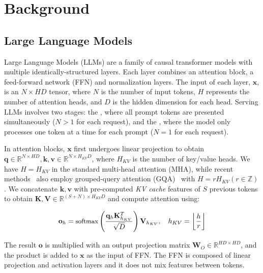 \section{Background}
\subsection{Large Language Models}
\label{sect:background:preliminaries}

Large Language Models (LLMs) are a family of causal transformer models with multiple identically-structured layers. Each layer combines an attention block, a feed-forward network (FFN) and normalization layers. The input of each layer, $\mathbf{x}$, is an $N\times HD$ tensor, where $N$ is the number of input tokens, $H$ represents the number of attention heads, and $D$ is the hidden dimension for each head. Serving LLMs involves two stages: the \contextstage, where all prompt tokens are presented simultaneously ($N > 1$ for each request), and the \decodingstage, where the model only processes one token at a time for each prompt ($N = 1$ for each request).

In attention blocks, $\mathbf{x}$ first undergoes linear projection to obtain $\mathbf{q}\in\mathbb{R}^{N\times HD},\mathbf{k},\mathbf{v}\in\mathbb{R}^{N\times H_{KV}D}$, where $H_{KV}$ is the number of key/value heads. We have $H = H_{KV}$ in the standard multi-head attention (MHA), while recent methods~\cite{touvron2023llama2,jiang2023mistral,jiang2024mixtral} also employ grouped-query attention (GQA)~\cite{ainslie2023gqa} with $H = rH_{KV} (r\in \mathbb{Z})$. We concatenate $\mathbf{k},\mathbf{v}$ with pre-computed \textit{KV cache} features of $S$ previous tokens to obtain $\mathbf{K}, \mathbf{V}\in\mathbb{R}^{(S+N)\times H_{KV}D}$ and compute attention using:

\vspace{-10pt}
\begin{equation}
\small
\mathbf{o}_{h} = \text{softmax}\left(\frac{\mathbf{q}_{h}\mathbf{K}_{h_{KV}}^T}{\sqrt{D}}\right)\mathbf{V}_{h_{KV}},\quad h_{KV}=\left\lfloor\frac{h}{r}\right\rfloor
\label{eqn:background:attn}
\end{equation}
\vspace{-10pt}

The result $\mathbf{o}$ is multiplied with an output projection matrix $\mathbf{W}_O \in \mathbb{R}^{HD \times HD}$, and the product is added to $\mathbf{x}$ as the input of FFN. The FFN is composed of linear projection and activation layers and it does not mix features between tokens. 

